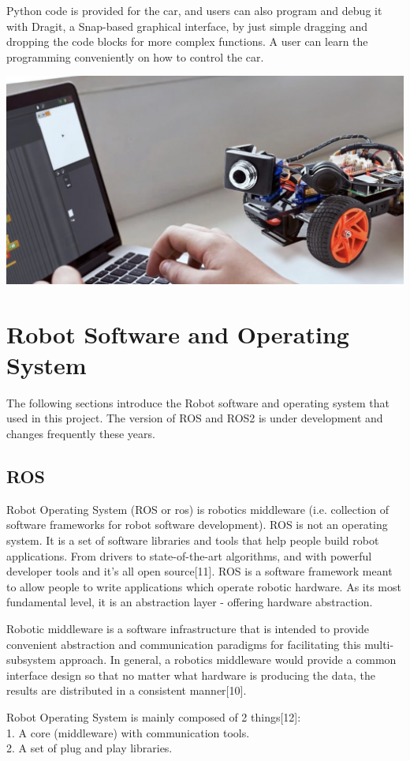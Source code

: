 \documentclass{mproj}
\begin{document}
Python code is provided for the car, and users can also program and debug it with Dragit, a Snap-based graphical interface, by just simple dragging and dropping the code blocks for more complex functions. A user can learn the programming conveniently on how to control the car.

\includegraphics[width = .7\textwidth]{a.jpg}

\section{Robot Software and Operating System}
The following sections introduce the Robot software and operating system that used in this project. The version of ROS and ROS2 is under development and changes frequently these years.

\subsection{ROS}
Robot Operating System (ROS or ros) is robotics middleware (i.e. collection of software frameworks for robot software development). ROS is not an operating system. It is a set of software libraries and tools that help people build robot applications. From drivers to state-of-the-art algorithms, and with powerful developer tools and it’s all open source[11]. ROS is a software framework meant to allow people to write applications which operate robotic hardware. As its most fundamental level, it is an abstraction layer - offering hardware abstraction.  

Robotic middleware is a software infrastructure that is intended to provide convenient abstraction and communication paradigms for facilitating this multi-subsystem approach. In general, a robotics middleware would provide a common interface design so that no matter what hardware is producing the data, the results are distributed in a consistent manner[10].


Robot Operating System is mainly composed of 2 things[12]: \\
1. A core (middleware) with communication tools. \\
2. A set of plug and play libraries.
\end{document}
